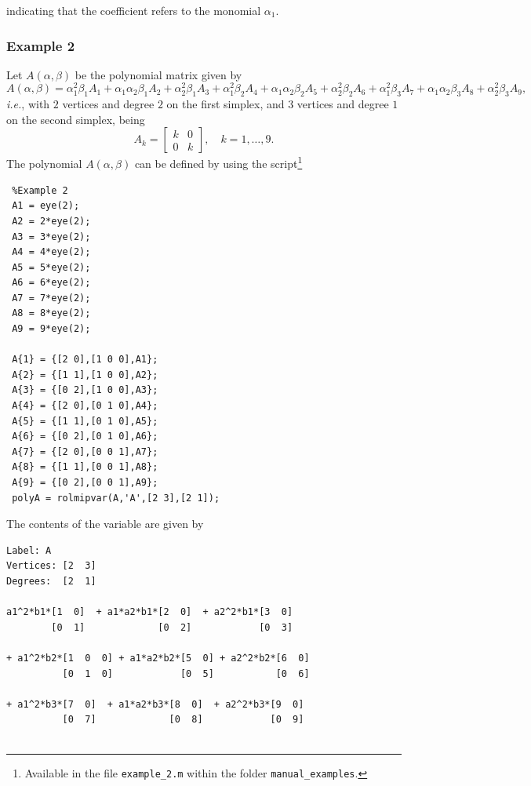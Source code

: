 \documentclass[english,11pt]{article}
\theoremstyle{break} \theorembodyfont{\small\rm}
\begin{document}
indicating that the coefficient  refers to the monomial $\alpha_1$.
\vspace{0.2cm}





\subsubsection*{Example 2}
Let $A(\alpha,\beta)$ be the polynomial matrix given by
\[
A(\alpha,\beta) = \alpha_1^2\beta_1 A_1 + \alpha_1\alpha_2\beta_1 A_2 + \alpha_2^2\beta_1 A_3 +
\alpha_1^2\beta_2 A_4 + \alpha_1\alpha_2\beta_2 A_5 + \alpha_2^2\beta_2 A_6 +
\alpha_1^2\beta_3 A_7 + \alpha_1\alpha_2\beta_3 A_8 + \alpha_2^2\beta_3 A_9,
\]
\textit{i.e.}, with $2$ vertices and degree $2$ on the first simplex, and $3$ vertices
and degree $1$ on the second simplex, being 
\[
 A_k = \begin{bmatrix} k & 0 \\ 0 & k \end{bmatrix}, \quad k = 1, \ldots, 9.
\]
The polynomial $A(\alpha,\beta)$
can be defined by using the script\footnote{Available in the file \texttt{example\_2.m} within the folder \texttt{manual\_examples}.}

\begin{minipage}{9.5cm}
\begin{lstlisting}
 %Example 2
 A1 = eye(2);
 A2 = 2*eye(2);
 A3 = 3*eye(2);
 A4 = 4*eye(2);
 A5 = 5*eye(2);
 A6 = 6*eye(2);
 A7 = 7*eye(2);
 A8 = 8*eye(2);
 A9 = 9*eye(2); 
 
 A{1} = {[2 0],[1 0 0],A1};
 A{2} = {[1 1],[1 0 0],A2};
 A{3} = {[0 2],[1 0 0],A3};
 A{4} = {[2 0],[0 1 0],A4};
 A{5} = {[1 1],[0 1 0],A5};
 A{6} = {[0 2],[0 1 0],A6};
 A{7} = {[2 0],[0 0 1],A7};
 A{8} = {[1 1],[0 0 1],A8};
 A{9} = {[0 2],[0 0 1],A9};
 polyA = rolmipvar(A,'A',[2 3],[2 1]);
\end{lstlisting}
\end{minipage}

The contents of the variable  are given by

\begin{minipage}{13.0cm}
\begin{lstlisting}[rulecolor=\color{red}]
Label: A
Vertices: [2  3]
Degrees:  [2  1]
 
a1^2*b1*[1  0]  + a1*a2*b1*[2  0]  + a2^2*b1*[3  0]     
        [0  1]             [0  2]            [0  3]    
        
+ a1^2*b2*[1  0  0] + a1*a2*b2*[5  0] + a2^2*b2*[6  0]
          [0  1  0]            [0  5]           [0  6]      
          
+ a1^2*b3*[7  0]  + a1*a2*b3*[8  0]  + a2^2*b3*[9  0]
          [0  7]             [0  8]            [0  9]
           
\end{lstlisting}
\end{minipage}
\end{document}
